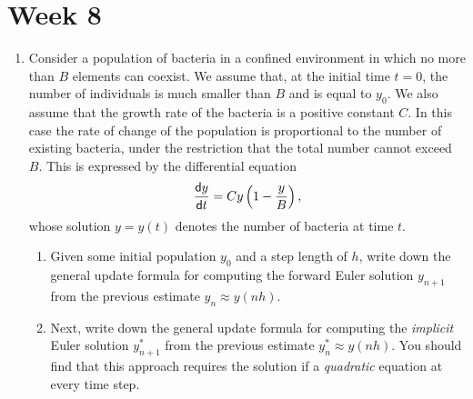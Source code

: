 \documentclass[11pt,a4paper]{article}
\newcommand{\dif}{\mathsf{d}}
\begin{document}


\section*{Week 8}

 \begin{enumerate}
\item \label{qdjsode2}
 Consider a population of bacteria in a confined environment in which no more than 
 $B$ elements can coexist. We assume that, at the initial time $t=0$, the number of individuals
 is  much smaller than $B$ and is equal to $y_0$. We also assume that
 the growth rate of the bacteria is a positive constant  $C$.
 In this case the rate of change of the population is proportional to the number
 of existing bacteria, under the restriction that the total number cannot exceed
 $B$. This is expressed by the differential equation 
 $${\dif y\over \dif t} = Cy \left( 1-{y\over B}\right),$$
 whose solution $y=y(t)$ denotes the number of bacteria at time $t$.
 
 \begin{enumerate}
\item 
Given some initial population $y_0$ and a  step length of $h$,
write down the general update formula for computing the forward Euler 
solution  $y_{n+1}$  from the previous estimate $y_n\approx y(nh)$.
\item 
Next, write down the general update formula for computing the {\it implicit} Euler 
solution  $y^*_{n+1}$  from the previous estimate $y^*_n \approx y(nh)$.
You should find that this approach requires the solution if a 
{\it quadratic} equation at every time step.  \end{enumerate}


\end{enumerate}
\end{document}

